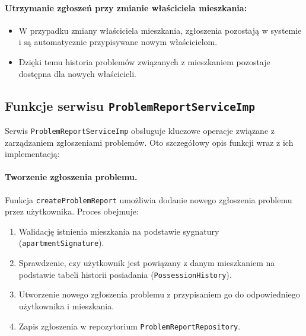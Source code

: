 \paragraph{Utrzymanie zgłoszeń przy zmianie właściciela mieszkania:}
\begin{itemize}
    \item W przypadku zmiany właściciela mieszkania, zgłoszenia pozostają w systemie i są automatycznie przypisywane nowym właścicielom.
    \item Dzięki temu historia problemów związanych z mieszkaniem pozostaje dostępna dla nowych właścicieli.
\end{itemize}


\subsection{Funkcje serwisu \texttt{ProblemReportServiceImp}}

Serwis \texttt{ProblemReportServiceImp} obsługuje kluczowe operacje związane z zarządzaniem zgłoszeniami problemów. Oto szczegółowy opis funkcji wraz z ich implementacją:

\paragraph{Tworzenie zgłoszenia problemu.}

Funkcja \texttt{createProblemReport} umożliwia dodanie nowego zgłoszenia problemu przez użytkownika. Proces obejmuje:
\begin{enumerate}
    \item Walidację istnienia mieszkania na podstawie sygnatury (\texttt{apartmentSignature}).
    \item Sprawdzenie, czy użytkownik jest powiązany z danym mieszkaniem na podstawie tabeli historii posiadania (\texttt{PossessionHistory}).
    \item Utworzenie nowego zgłoszenia problemu z przypisaniem go do odpowiedniego użytkownika i mieszkania.
    \item Zapis zgłoszenia w repozytorium \texttt{ProblemReportRepository}.
\end{enumerate}

